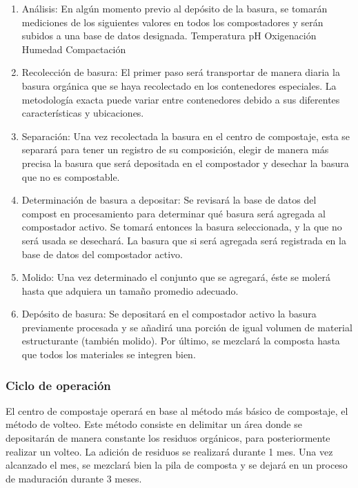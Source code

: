\begin{enumerate}
    \item Análisis: En algún momento previo al depósito de la basura, se tomarán mediciones de los siguientes valores en todos los compostadores y serán subidos a una base de datos designada.
        \subitem Temperatura
        \subitem pH
        \subitem Oxigenación
        \subitem Humedad
        \subitem Compactación
    \item Recolección de basura: El primer paso será transportar de manera diaria la basura orgánica que se haya recolectado en los contenedores especiales. La metodología exacta puede variar entre contenedores debido a sus diferentes características y ubicaciones.
    \item Separación: Una vez recolectada la basura en el centro de compostaje, esta se separará para tener un registro de su composición, elegir de manera más precisa la basura que será depositada en el compostador y desechar la basura que no es compostable.
    \item Determinación de basura a depositar: Se revisará la base de datos del compost en procesamiento para determinar qué basura será agregada al compostador activo. Se tomará entonces la basura seleccionada, y la que no será usada se desechará. La basura que si será agregada será registrada en la base de datos del compostador activo.
    \item Molido: Una vez determinado el conjunto que se agregará, éste se molerá hasta que adquiera un tamaño promedio adecuado.
    \item Depósito de basura: Se depositará en el compostador activo la basura previamente procesada y se añadirá una porción de igual volumen de material estructurante (también molido). Por último, se mezclará la composta hasta que todos los materiales se integren bien.
\end{enumerate}


\subsubsection{Ciclo de operación}

El centro de compostaje operará en base al método más básico de compostaje, el método de volteo. Este método consiste en delimitar un área donde se depositarán de manera constante los residuos orgánicos, para posteriormente realizar un volteo. La adición de residuos se realizará durante 1 mes. Una vez alcanzado el mes, se mezclará bien la pila de composta y se dejará en un proceso de maduración durante 3 meses.

